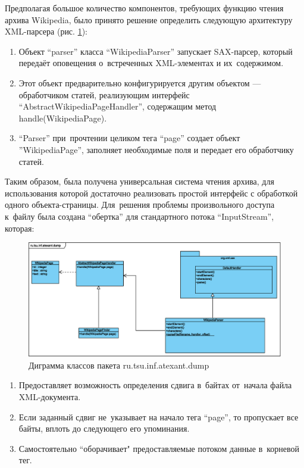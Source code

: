 Предполагая большое количество компонентов, требующих функцию чтения архива Wikipedia,
было принято решение определить следующую архитектуру XML-парсера (рис. \ref{uml:ru.tsu.inf.atexant.dump}):

\begin{enumerate}

\item{
Объект ``parser'' класса ``WikipediaParser'' запускает SAX-парсер, 
который передаёт оповещения о~встреченных XML-элементах и их~содержимом.
}

\item {
Этот объект предварительно конфигурируется другим объектом --- обработчиком статей,
 реализующим интерфейс ``AbstractWikipediaPageHandler'', 
содержащим метод handle(WikipediaPage).
}

\item{
``Parser'' при~прочтении целиком тега ``page'' создает объект ''WikipediaPage'', 
заполняет необходимые поля и передает его обработчику статей.
}

\end{enumerate}




Таким образом, была получена универсальная система чтения архива, 
для использования которой достаточно реализовать простой интерфейс с обработкой одного объекта-страницы.
Для~решения проблемы произвольного доступа к~файлу была создана ``обертка'' для стандартного потока ``InputStream'', которая:

\begin{figure}
\begin{center}
\includegraphics[scale=0.6]{eps/ru.tsu.inf.atexant.dump.eps}
\caption{Диграмма классов пакета ru.tsu.inf.atexant.dump}
\label{uml:ru.tsu.inf.atexant.dump}
\end{center}
\end{figure}

\begin{enumerate}

\item{
Предоставляет возможность определения сдвига в~байтах от~начала файла XML-документа.
}

\item {
Если заданный сдвиг не~указывает на начало тега ``page'', 
то пропускает все байты, 
вплоть до следующего его упоминания.
}

\item{
Самостоятельно “оборачивает" предоставляемые потоком данные в~корневой тег.
}

\end{enumerate}

